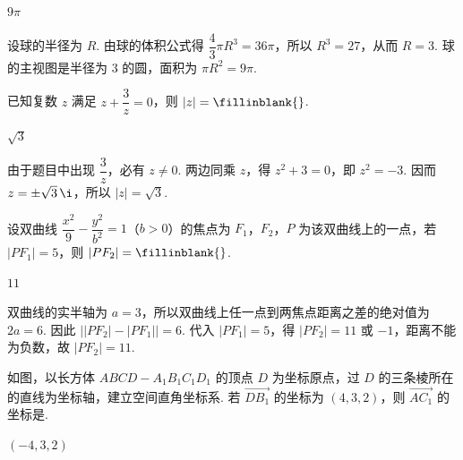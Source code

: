 \begin{answer}
\(9\pi\)
\end{answer}

\begin{solution}
设球的半径为 \(R\). 由球的体积公式得 \(\dfrac43\pi R^3=36\pi\)，所以 \(R^3=27\)，从而 \(R=3\). 球的主视图是半径为 \(3\) 的圆，面积为 \(\pi R^2=9\pi\).
\end{solution}

\begin{problem}
已知复数 \(z\) 满足 \(z+\dfrac3z=0\)，则 \(\lvert z\rvert=\fillinblank{}\).
\end{problem}

\begin{answer}
\(\sqrt3\)
\end{answer}

\begin{solution}
由于题目中出现 \(\dfrac3z\)，必有 \(z\ne0\). 两边同乘 \(z\)，得 \(z^2+3=0\)，即 \(z^2=-3\). 因而 \(z=\pm\sqrt3\,\i\)，所以 \(\lvert z\rvert=\sqrt3\).
\end{solution}

\begin{problem}
设双曲线 \(\dfrac{x^2}{9}-\dfrac{y^2}{b^2}=1\)（\(b>0\)）的焦点为 \(F_1\)，\(F_2\)，\(P\) 为该双曲线上的一点，若 \(\lvert PF_1\rvert=5\)，则 \(\lvert PF_2\rvert=\fillinblank{}\).
\end{problem}

\begin{answer}
\(11\)
\end{answer}

\begin{solution}
双曲线的实半轴为 \(a=3\)，所以双曲线上任一点到两焦点距离之差的绝对值为 \(2a=6\). 因此 \(\bigl\lvert\lvert PF_2\rvert-\lvert PF_1\rvert\bigr\rvert=6\). 代入 \(\lvert PF_1\rvert=5\)，得 \(\lvert PF_2\rvert=11\) 或 \(-1\)，距离不能为负数，故 \(\lvert PF_2\rvert=11\).
\end{solution}

\begin{problem}
如图，以长方体 \(ABCD-A_1B_1C_1D_1\) 的顶点 \(D\) 为坐标原点，过 \(D\) 的三条棱所在的直线为坐标轴，建立空间直角坐标系. 若 \(\overrightarrow{DB_1}\) 的坐标为 \((4,3,2)\)，则 \(\overrightarrow{AC_1}\) 的坐标是\fillinblank{}.

\end{problem}

\begin{answer}
\((-4,3,2)\)
\end{answer}

